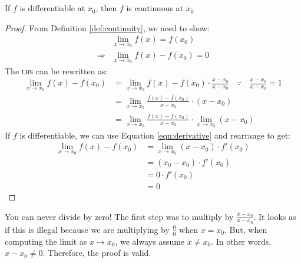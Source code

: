 \documentclass[../main.tex]{subfiles}
\begin{document}
\section*{}
\begin{thm}
    If $f$ is differentiable at $x_0$, then $f$ is continuous 
    at $x_0$
\end{thm}
\begin{proof}
    From Definition \ref{def:continuity}, we need to show:
    \begin{align*}
        &\lim_{x \to x_0} f(x) = f \left( x_0 \right)\\
        \Rightarrow &\lim_{x \to x_0} f(x) - f \left( x_0 \right) = 0
    \end{align*}
    The \textsc{lhs} can be rewritten as:
    \begin{align*}
        \lim_{x \to x_0} f(x) - f \left( x_0 \right)
        &=  \lim_{x \to x_0} f(x) - f \left( x_0 \right)
            \cdot \frac{x - x_0}{x - x_0} \quad \because \quad
            \frac{x - x_0}{x - x_0} = 1\\
        &=  \lim_{x \to x_0} \frac{f(x) - f \left( x_0 \right)}{x - x_0}
            \cdot \left( x - x_0 \right)\\
        &=  \lim_{x \to x_0} \frac{f(x) - f \left( x_0 \right)}{x - x_0}
            \cdot \lim_{x \to x_0} \left( x - x_0 \right)
    \end{align*}
    If $f$ is differentiable, we can use Equation \ref{eqn:derivative} 
    and rearrange to get:
    \begin{align*}
        \lim_{x \to x_0} f(x) - f \left( x_0 \right)
        &=  \lim_{x \to x_0} \left( x - x_0 \right)
            \cdot f' \left( x_0 \right)\\
        &=  \left( x_0 - x_0 \right) \cdot f' \left( x_0 \right)\\
        &=  0 \cdot f' \left( x_0 \right)\\
        &=  0
    \end{align*}
\end{proof}
\begin{note}
    You can never divide by zero! The first step was to multiply by 
    $\frac{x - x_0}{x - x_0}$. It looks as if this is illegal because 
    we are multiplying by $\frac{0}{0}$ when $x = x_0$. But, when computing 
    the limit as $x \to x_0$, we always assume $x \neq x_0$. In other words, 
    $x - x_0 \neq 0$. Therefore, the proof is valid.
\end{note}
\end{document}
